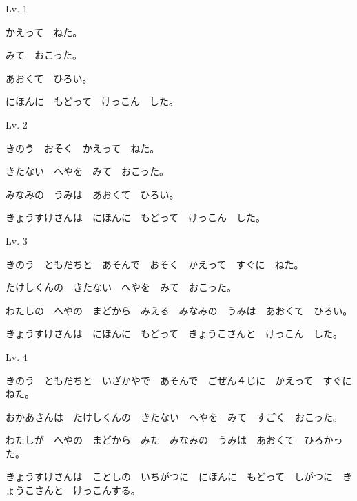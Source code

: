 

\author{Tomislav Mamić}


	
	
	\begin{mondai}{Lv. 1}
		\item かえって　ねた。
		\item みて　おこった。
		\item あおくて　ひろい。
		\item にほんに　もどって　けっこん　した。
	\end{mondai}

	\vspace{-20pt}
	\begin{mondai}{Lv. 2}
		\item きのう　おそく　かえって　ねた。
		\item きたない　へやを　みて　おこった。
		\item みなみの　うみは　あおくて　ひろい。
		\item きょうすけさんは　にほんに　もどって　けっこん　した。
	\end{mondai}

	\vspace{-20pt}
	\begin{mondai}{Lv. 3}
		\item きのう　ともだちと　あそんで　おそく　かえって　すぐに　ねた。
		\item たけしくんの　きたない　へやを　みて　おこった。
		\item わたしの　へやの　まどから　みえる　みなみの　うみは　あおくて　ひろい。
		\item きょうすけさんは　にほんに　もどって　きょうこさんと　けっこん　した。
	\end{mondai}

	\vspace{-20pt}
	\begin{mondai}{Lv. 4}
		\item きのう　ともだちと　いざかやで　あそんで　ごぜん４じに　かえって　すぐに　ねた。
		\item おかあさんは　たけしくんの　きたない　へやを　みて　すごく　おこった。
		\item わたしが　へやの　まどから　みた　みなみの　うみは　あおくて　ひろかった。
		\item きょうすけさんは　ことしの　いちがつに　にほんに　もどって　しがつに　きょうこさんと　けっこんする。
	\end{mondai}
	

